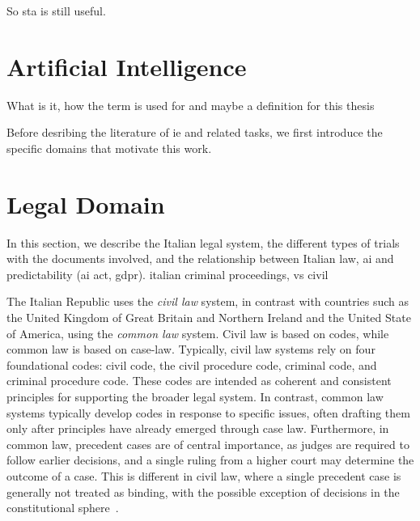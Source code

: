 So \acl{sta} is still useful. 

\section{Artificial Intelligence}
What is it, how the term is used for and maybe a definition for this thesis

Before desribing the literature of \ac{ie} and related tasks, we first introduce the specific domains that motivate this work.



\section{Legal Domain}
\label{sec:domains}
In this section, we describe the Italian legal system, the different types of trials with the documents involved, and the relationship between Italian law, \acl{ai} and predictability (ai act, gdpr).
italian criminal proceedings, vs civil

The Italian Republic uses the \emph{civil law} system, in contrast with countries such as the United Kingdom of Great Britain and Northern Ireland and the United State of America, using the \emph{common law} system. Civil law is based on codes, while common law is based on case-law. Typically, civil law systems rely on four foundational codes: civil code, the civil procedure code, criminal code, and criminal procedure code.  These codes are intended as coherent and consistent principles for supporting the broader legal system. In contrast, common law systems typically develop codes in response to specific issues, often drafting them only after principles have already emerged through case law.
Furthermore, in common law, precedent cases are of central importance, as judges are required to follow earlier decisions, and a single ruling from a higher court may determine the outcome of a case. This is different in civil law, where a single precedent case is generally not treated as binding, with the possible exception of decisions in the constitutional sphere~\cite{Carlson2009}. 

